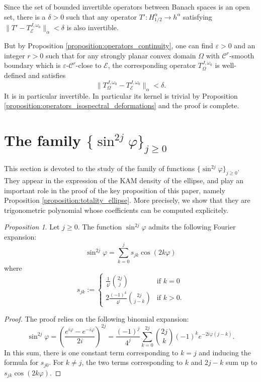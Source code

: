 \documentclass[12pt, openany]{amsart}
\theoremstyle{definition}
\theoremstyle{remark}
\theoremstyle{remark}
\theoremstyle{theorem}
\theoremstyle{theorem}
\theoremstyle{theorem}
\newtheorem{proposition}[theorem]{Proposition}
\theoremstyle{theorem}
\begin{document}
Since the set of bounded invertible operators between Banach spaces is an open set, there is a $\delta>0$ such that any operator $T':H^{\alpha}_{1/2} \to h^{\alpha}$ satisfying $\|T'-T_{\mathscr E}^{J,\omega_0}\|_{\alpha}<\delta$ is also invertible.

But by Proposition \ref{proposition:operators_continuity}, one can find $\varepsilon>0$ and an integer $r>0$ such that for any strongly planar convex domain $\Omega$ with $\mathscr C^r$-smooth boundary which is $\varepsilon$-$\mathscr C^r$-close to $\mathscr E$, the corresponding operator 
$T_{\Omega}^{J,\omega_0}$
is well-defined
and satisfies
\[
\|T_{\Omega}^{J,\omega_0}-T_{\mathscr E}^{J,\omega_0}\|_{\alpha}<\delta.
\]
It is in particular invertible. In particular its kernel is trivial by Proposition \ref{proposition:operators_isospectral_deformations} and the proof is complete.





\appendix
\section{The family $\{\sin^{2j} \varphi \}_{j\geq 0}$}
\label{section:sinus_family}

This section is devoted to the study of the family of functions $\{\sin^{2j} \varphi \}_{j\geq 0}$. They appear in the expression of the KAM density of the ellipse, and play an important role in the proof of the key proposition of this paper, namely Proposition \ref{proposition:totality_ellipse}. More precisely, we show that they are trigonometric polynomial whose coefficients can be computed explicitely.

\begin{proposition}
\label{proposition:even_powers_sin}
Let $j\geq 0$. The function $\sin^{2j} \varphi$ admits the following Fourier expansion:
\[
\sin^{2j}\varphi = \sum_{k=0}^j s_{jk} \cos(2k\varphi)
\]
where
\[
s_{jk} := \left\{
\begin{array}{cl}
\frac{1}{4^j}\binom{2j}{j}&\text{if } k=0\\
2\frac{(-1)^{k}}{4^j}\binom{2j}{j-k}&\text{if } k>0.
\end{array}
\right.
\]
\end{proposition}

\begin{proof}
The proof relies on the following binomial expansion:
\[
\sin^{2j}\varphi = \left(\frac{e^{i\varphi}-e^{-i\varphi}}{2i}\right)^{2j}
=\frac{(-1)^j}{4^j}\sum_{k=0}^{2j}\binom{2j}{k}(-1)^ke^{-2i\varphi(j-k)}.
\]
In this sum, there is one constant term corresponding to $k=j$ and inducing the formula for $s_{j0}$. For $k\neq j$, the two terms corresponding to $k$ and $2j-k$ sum up to $s_{jk}\cos(2k\varphi)$.
\end{proof}
\end{document}
